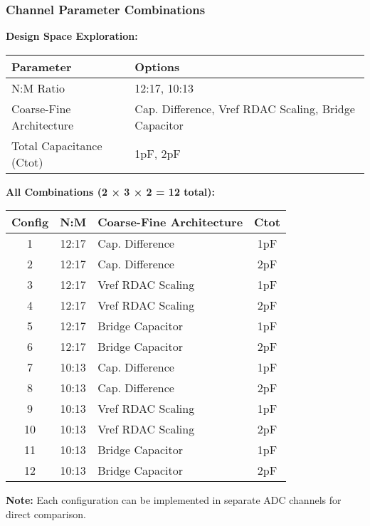 \documentclass[aspectratio=169]{beamer}
\begin{document}
\begin{frame}
  \frametitle{Channel Parameter Combinations}
  \begin{center}
    \footnotesize
    \textbf{Design Space Exploration:} \\
    \vspace{0.3cm}
    
    \begin{tabular}{|l|l|}
    \hline
    \textbf{Parameter} & \textbf{Options} \\
    \hline
    N:M Ratio & 12:17, 10:13 \\
    \hline
    Coarse-Fine Architecture & Cap. Difference, Vref RDAC Scaling, Bridge Capacitor \\
    \hline
    Total Capacitance (Ctot) & 1pF, 2pF \\
    \hline
    \end{tabular}
    
    \vspace{0.5cm}
    
    \textbf{All Combinations (2 × 3 × 2 = 12 total):} \\
    \vspace{0.3cm}
    
    \tiny
    \begin{tabular}{|c|c|l|c|}
    \hline
    \textbf{Config} & \textbf{N:M} & \textbf{Coarse-Fine Architecture} & \textbf{Ctot} \\
    \hline
    1  & 12:17 & Cap. Difference & 1pF \\
    2  & 12:17 & Cap. Difference & 2pF \\
    3  & 12:17 & Vref RDAC Scaling & 1pF \\
    4  & 12:17 & Vref RDAC Scaling & 2pF \\
    5  & 12:17 & Bridge Capacitor & 1pF \\
    6  & 12:17 & Bridge Capacitor & 2pF \\
    7  & 10:13 & Cap. Difference & 1pF \\
    8  & 10:13 & Cap. Difference & 2pF \\
    9  & 10:13 & Vref RDAC Scaling & 1pF \\
    10 & 10:13 & Vref RDAC Scaling & 2pF \\
    11 & 10:13 & Bridge Capacitor & 1pF \\
    12 & 10:13 & Bridge Capacitor & 2pF \\
    \hline
    \end{tabular}
    
    \vspace{0.3cm}
    \textbf{Note:} Each configuration can be implemented in separate ADC channels for direct comparison.
  \end{center}
\end{frame}
\end{document}
